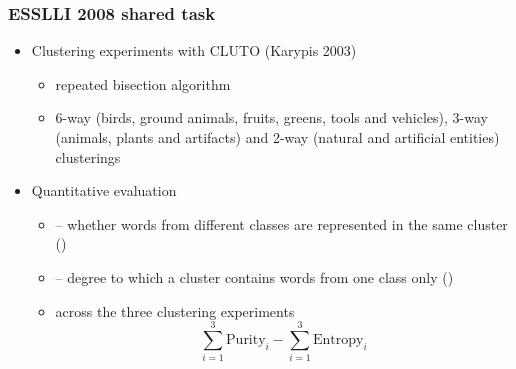 \documentclass[t]{beamer} %
\begin{document}
\begin{frame}
\frametitle{ESSLLI 2008 shared task}
\begin{itemize}
\item Clustering experiments with CLUTO (Karypis 2003)
\begin{itemize}
\item repeated bisection algorithm
\item 6-way (birds, ground animals, fruits, greens,
tools and vehicles), 3-way (animals, plants and
artifacts) and 2-way (natural and artificial entities) clusterings
\end{itemize}
\pause
\item Quantitative evaluation
\begin{itemize}
\item {} -- whether words from different classes are represented in the same cluster ()
\item {} -- degree to which a cluster contains words from one class only ()
\item {} across the three clustering experiments
\begin{displaymath}
\sum_{i=1}^3 \text{Purity}_i -  \sum_{i=1}^3 \text{Entropy}_i
\end{displaymath}
\end{itemize}
\end{itemize}
\end{frame}
\end{document}
